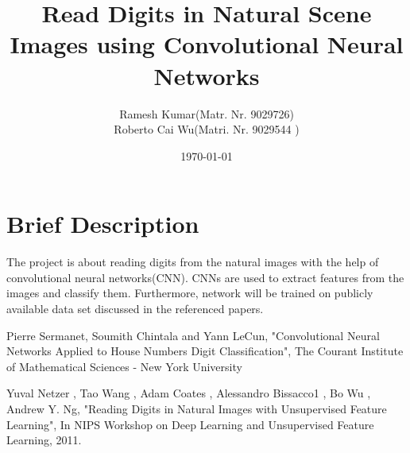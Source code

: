 \documentclass[12pt, letterpaper]{article}
\title{Read Digits in Natural Scene Images using Convolutional Neural Networks }
\author{Ramesh Kumar(Matr. Nr. 9029726) \\ Roberto Cai Wu(Matri. Nr. 9029544 )}
\date{\today}
\begin{document}
\begin{titlepage}
\maketitle
\end{titlepage}

\section{Brief Description}
The project is about reading digits from the natural images with the help of convolutional neural networks(CNN). CNNs are used to extract features from the images and classify them. Furthermore, network will be trained on publicly available data set discussed in the referenced papers.\cite{Convolutional Neural Networks Applied to House Numbers Digit Classification}\cite{Reading Digits in Natural Images
	with Unsupervised Feature Learning}

\begin{thebibliography}{9}
Pierre Sermanet, Soumith Chintala and Yann LeCun, "Convolutional Neural Networks Applied to
House Numbers Digit Classification", The Courant Institute of Mathematical Sciences - New York University 


Yuval Netzer
, Tao Wang
, Adam Coates
, Alessandro Bissacco1
, Bo Wu
, Andrew Y. Ng, "Reading Digits in Natural Images
with Unsupervised Feature Learning", In NIPS Workshop on Deep
Learning and Unsupervised Feature Learning, 2011.
\end{thebibliography} 
\end{document}
